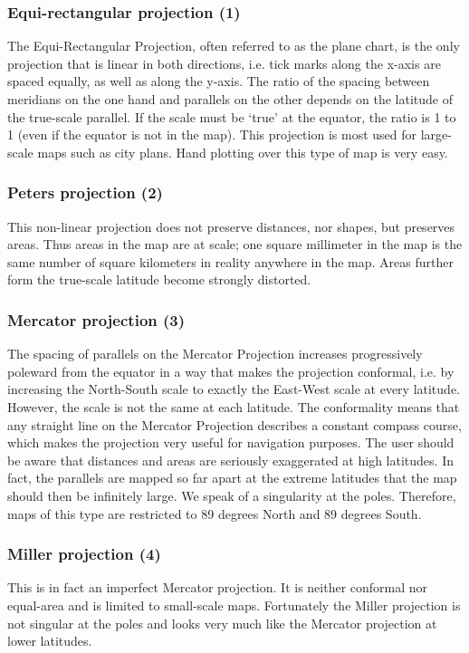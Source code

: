 \documentclass[titlepage,a4paper]{article}
\begin{document}
\subsubsection*{Equi-rectangular projection (1)}
The Equi-Rectangular Projection, often referred to as the plane chart,
is the only projection that is linear in both directions, i.e. tick marks
along the x-axis are spaced equally, as well as along the y-axis. The ratio
of the spacing between meridians on the one hand and parallels on the other
depends on the latitude of the true-scale parallel. If the scale must be
`true' at the equator, the ratio is 1 to 1 (even if the equator is not in the
map). This projection is most used for large-scale maps such as city plans.
Hand plotting over this type of map is very easy.

\subsubsection*{Peters projection (2)} 
This non-linear projection does not preserve distances, nor shapes, but
preserves areas. Thus areas in the map are at scale; one square millimeter
in the map is the same number of square kilometers in reality anywhere in
the map. Areas further form the true-scale latitude become strongly distorted.

\subsubsection*{Mercator projection (3)}
The spacing of parallels on the Mercator Projection increases progressively
poleward from the equator in a way that makes the projection conformal, i.e.
by increasing the North-South scale to exactly the East-West scale at every
latitude. However, the scale is not the same at each latitude. The conformality
means that any straight line on the Mercator Projection describes a constant
compass course, which makes the projection very useful for navigation purposes.
The user should be aware that distances and areas are seriously exaggerated at
high latitudes.  In fact, the parallels are mapped so far apart at the extreme
latitudes that the map should then be infinitely large. We speak of a
singularity at the poles. Therefore, maps of this type are restricted to 89
degrees North and 89 degrees South.

\subsubsection*{Miller projection (4)}
This is in fact an imperfect Mercator projection. It is neither conformal
nor equal-area and is limited to small-scale maps. Fortunately the
Miller projection is not singular at the poles and looks very much like
the Mercator projection at lower latitudes.
\end{document}
